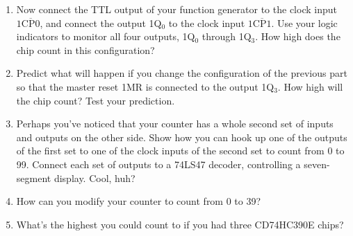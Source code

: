 \begin{enumerate}
\item Now connect the TTL output of your function generator to the clock input $1\mathrm{\overline{CP0}}$, and connect the output 1Q$_0$ to the clock input $1\mathrm{\overline{CP1}}$.  Use your logic indicators to monitor all four outputs, 1Q$_0$ through 1Q$_3$.  How high does the chip count in this configuration?  

\item Predict what will happen if you change the configuration of the previous part so that the master reset 1MR is connected to the output 1Q$_3$.  How high will the chip count?  Test your prediction.

\pagebreak[2]
\item Perhaps you've noticed that your counter has a whole second set of inputs and outputs on the other side.  Show how you can hook up one of the outputs of the first set to one of the clock inputs of the second set to count from 0 to 99.  Connect each set of outputs to a 74LS47 decoder, controlling a seven-segment display.  Cool, huh?

\item How can you modify your counter to count from 0 to 39?  

\item What's the highest you could count to if you had three CD74HC390E chips?


\end{enumerate}
